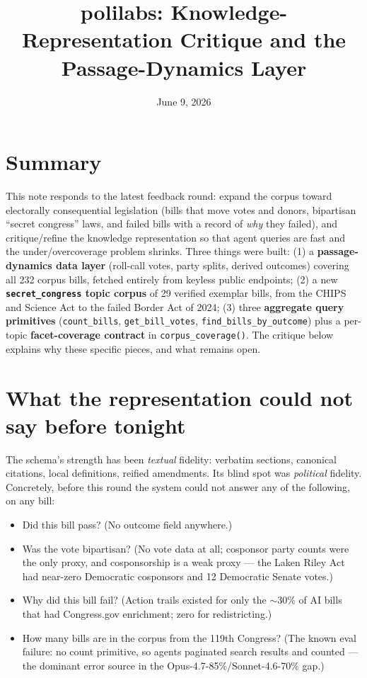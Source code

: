 \documentclass[11pt]{article}
\title{polilabs: Knowledge-Representation Critique and the Passage-Dynamics Layer}
\author{}
\date{June 9, 2026}
\newcommand{\code}[1]{\texttt{#1}}
\begin{document}
\maketitle

\section*{Summary}

This note responds to the latest feedback round: expand the corpus toward
electorally consequential legislation (bills that move votes and donors,
bipartisan ``secret congress'' laws, and failed bills with a record of
\emph{why} they failed), and critique/refine the knowledge representation so
that agent queries are fast and the under/overcoverage problem shrinks. Three
things were built: (1) a \textbf{passage-dynamics data layer} (roll-call
votes, party splits, derived outcomes) covering all 232 corpus bills, fetched
entirely from keyless public endpoints; (2) a new \textbf{\code{secret\_congress}
topic corpus} of 29 verified exemplar bills, from the CHIPS and Science Act to
the failed Border Act of 2024; (3) three \textbf{aggregate query primitives}
(\code{count\_bills}, \code{get\_bill\_votes}, \code{find\_bills\_by\_outcome})
plus a per-topic \textbf{facet-coverage contract} in \code{corpus\_coverage()}.
The critique below explains why these specific pieces, and what remains open.

\section{What the representation could not say before tonight}

The schema's strength has been \emph{textual} fidelity: verbatim sections,
canonical citations, local definitions, reified amendments. Its blind spot was
\emph{political} fidelity. Concretely, before this round the system could not
answer any of the following, on any bill:

\begin{itemize}[itemsep=2pt]
  \item Did this bill pass? (No outcome field anywhere.)
  \item Was the vote bipartisan? (No vote data at all; cosponsor party
        counts were the only proxy, and cosponsorship is a weak proxy ---
        the Laken Riley Act had near-zero Democratic cosponsors and 12
        Democratic Senate votes.)
  \item Why did this bill fail? (Action trails existed for only the
        $\sim$30\% of AI bills that had Congress.gov enrichment; zero for
        redistricting.)
  \item How many bills are in the corpus from the 119th Congress? (The
        known eval failure: no count primitive, so agents paginated search
        results and counted --- the dominant error source in the
        Opus-4.7-85\%/Sonnet-4.6-70\% gap.)
\end{itemize}
\end{document}

